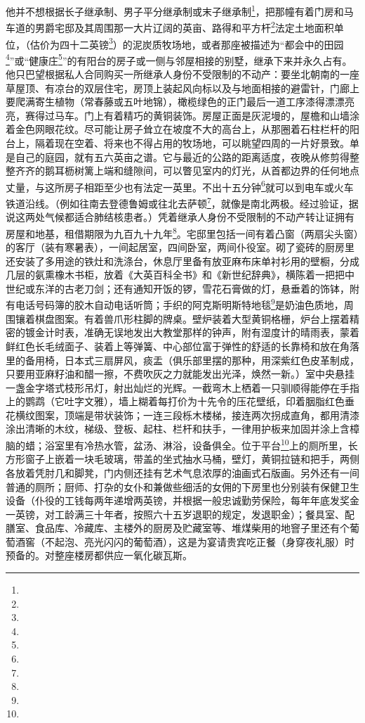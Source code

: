 \par 他并不想根据长子继承制、男子平分继承制或末子继承制\footnote{}，把那幢有着门房和马车道的男爵宅邸及其周围那一大片辽阔的英亩、路得和平方杆\footnote{}法定土地面积单位，（估价为四十二英镑\footnote{}）的泥炭质牧场地，或者那座被描述为“都会中的田园\footnote{}”或“健康庄\footnote{}”的有阳台的房子或一侧与邻屋相接的别墅，继承下来并永久占有。他只巴望根据私人合同购买一所继承人身份不受限制的不动产：要坐北朝南的一座草屋顶、有凉台的双层住宅，房顶上装起风向标以及与地面相接的避雷针，门廊上要爬满寄生植物（常春藤或五叶地锦），橄榄绿色的正门最后一道工序漆得漂漂亮亮，赛得过马车。门上有着精巧的黄铜装饰。房屋正面是灰泥墁的，屋檐和山墙涂着金色网眼花纹。尽可能让房子耸立在坡度不大的高台上，从那圈着石柱栏杆的阳台上，隔着现在空着、将来也不得占用的牧场地，可以眺望四周的一片好景致。单是自己的庭园，就有五六英亩之谱。它与最近的公路的距离适度，夜晚从修剪得整整齐齐的鹅耳枥树篱上端和缝隙间，可以瞥见室内的灯光，从首都边界的任何地点丈量，与这所房子相距至少也有法定一英里。不出十五分钟\footnote{}就可以到电车或火车铁道沿线。（例如往南去登德鲁姆或往北去萨顿\footnote{}，就像是南北两极。经过验证，据说这两处气候都适合肺结核患者。）凭着继承人身份不受限制的不动产转让证拥有房屋和地基，租借期限为九百九十九年\footnote{}。宅邸里包括一间有着凸窗（两扇尖头窗）的客厅（装有寒暑表），一间起居室，四间卧室，两间仆役室。砌了瓷砖的厨房里还安装了多用途的铁灶和洗涤台，休息厅里备有放亚麻布床单衬衫用的壁橱，分成几层的氨熏橡木书柜，放着《大英百科全书》和《新世纪辞典》，横陈着一把把中世纪或东洋的古老刀剑；还有通知开饭的锣，雪花石膏做的灯，悬垂着的饰钵，附有电话号码簿的胶木自动电话听筒；手织的阿克斯明斯特地毯\footnote{}是奶油色质地，周围镶着棋盘图案。有着兽爪形柱脚的牌桌。壁炉装着大型黄铜格栅，炉台上摆着精密的镀金计时表，准确无误地发出大教堂那样的钟声，附有湿度计的晴雨表，蒙着鲜红色长毛绒面子、装着上等弹簧、中心部位富于弹性的舒适的长靠椅和放在角落里的备用椅，日本式三扇屏风，痰盂（俱乐部里摆的那种，用深紫红色皮革制成，只要用亚麻籽油和醋一擦，不费吹灰之力就能发出光泽，焕然一新。）室中央悬挂一盏金字塔式枝形吊灯，射出灿烂的光辉。一截弯木上栖着一只驯顺得能停在手指上的鹦鹉（它吐字文雅），墙上糊着每打价为十先令的压花壁纸，印着胭脂红色垂花横纹图案，顶端是带状装饰；一连三段栎木楼梯，接连两次拐成直角，都用清漆涂出清晰的木纹，梯级、登板、起柱、栏杆和扶手，一律用护板来加固并涂上含樟脑的蜡；浴室里有冷热水管，盆汤、淋浴，设备俱全。位于平台\footnote{}上的厕所里，长方形窗子上嵌着一块毛玻璃，带盖的坐式抽水马桶，壁灯，黄铜拉链和把手，两侧各放着凭肘几和脚凳，门内侧还挂有艺术气息浓厚的油画式石版画。另外还有一间普通的厕所；厨师、打杂的女仆和兼做些细活的女佣的下房里也分别装有保健卫生设备（仆役的工钱每两年递增两英镑，并根据一般忠诚勤劳保险，每年年底发奖金一英镑，对工龄满三十年者，按照六十五岁退职的规定，发退职金）；餐具室、配膳室、食品库、冷藏库、主楼外的厨房及贮藏室等、堆煤柴用的地窨子里还有个葡萄酒窖（不起泡、亮光闪闪的葡萄酒），这是为宴请贵宾吃正餐（身穿夜礼服）时预备的。对整座楼房都供应一氧化碳瓦斯。
